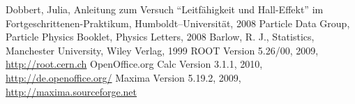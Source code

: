 \renewcommand{\refname}{Literatur und Programme}
\begin{thebibliography}{xxxxxx}
Dobbert, Julia, Anleitung zum Versuch ``Leitfähigkeit und Hall-Effekt'' im Fortgeschrittenen-Praktikum, Humboldt–Universität, 2008
Particle Data Group, Particle Physics Booklet, Physics Letters, 2008
Barlow, R. J., Statistics, Manchester University, Wiley Verlag, 1999
ROOT Version 5.26/00, 2009, \href{http://root.cern.ch}{http://root.cern.ch}
OpenOffice.org Calc Version 3.1.1, 2010,
\href{http://de.openoffice.org/}{http://de.openoffice.org/}
Maxima Version 5.19.2, 2009, \href{http://maxima.sourceforge.net}{http://maxima.sourceforge.net}
\end{thebibliography}